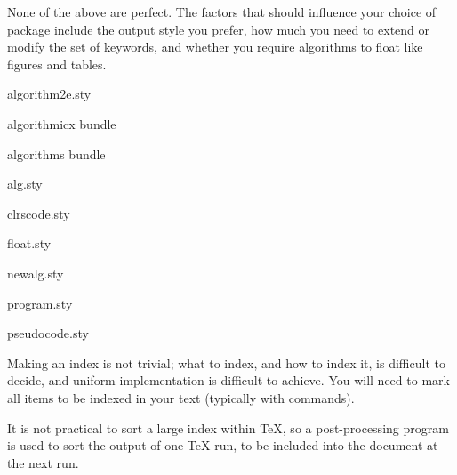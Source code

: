 None of the above are perfect.  The factors that should influence your
choice of package include the output style you prefer, how much you
need to extend or modify the set of keywords, and whether you require
algorithms to float like figures and tables.
\begin{ctanrefs}
\item[algorithm2e.sty]
\item[algorithmicx\nothtml{\rmfamily} bundle]
\item[algorithms\nothtml{\rmfamily} bundle]
\item[alg.sty]
\item[clrscode.sty]
\item[float.sty]
\item[newalg.sty]
\item[program.sty]
\item[pseudocode.sty]
\end{ctanrefs}


Making an index is not trivial; what to index, and how to index it, is
difficult to decide, and uniform implementation is difficult to
achieve.  You will need to mark all items to be indexed in your text
(typically with  commands).

It is not practical to sort a large index within \TeX{}, so a
post-processing program is used to sort the output of one \TeX{} run,
to be included into the document at the next run.

